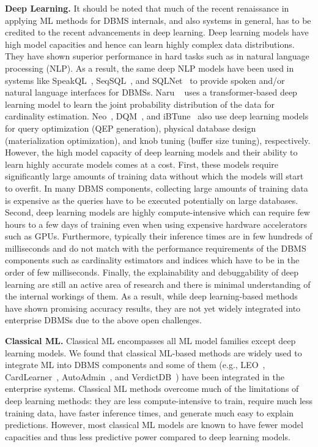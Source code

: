 \vspace{2mm}
\noindent \textbf{Deep Learning.} It should be noted that much of the recent renaissance in applying ML methods for DBMS internals, and also systems in general, has to be credited to the recent advancements in deep learning.
Deep learning models have high model capacities and hence can learn highly complex data distributions.
They have shown superior performance in hard tasks such as in natural language processing (NLP).
As a result, the same deep NLP models have been used in systems like SpeakQL~\cite{speakql}, SeqSQL~\cite{seq2sql}, and SQLNet~\cite{sqlnet} to provide spoken and/or natural language interfaces for DBMSs.
Naru ~\cite{naru} uses a transformer-based deep learning model to learn the joint probability distribution of the data for cardinality estimation.
Neo~\cite{neo}, DQM~\cite{dqm}, and iBTune~\cite{ibtune} also use deep learning models for query optimization (QEP generation), physical database design (materialization optimization), and knob tuning (buffer size tuning), respectively.
However, the high model capacity of deep learning models and their ability to learn highly accurate models comes at a cost.
First, these models require significantly large amounts of training data without which the models will start to overfit. In many DBMS components, collecting large amounts of training data is expensive as the queries have to be executed potentially on large databases.
Second, deep learning models are highly compute-intensive which can require few hours to a few days of training even when using expensive hardware accelerators such as GPUs.
Furthermore, typically their inference times are in few hundreds of milliseconds and do not match with the performance requirements of the DBMS components such as cardinality estimators and indices which have to be in the order of few milliseconds.
Finally, the explainability and debuggability of deep learning are still an active area of research and there is minimal understanding of the internal workings of them.
As a result, while deep learning-based methods have shown promising accuracy results, they are not yet widely integrated into enterprise DBMSs due to the above open challenges.


\vspace{2mm}
\noindent \textbf{Classical ML.} Classical ML encompasses all ML model families except deep learning models.
We found that classical ML-based methods are widely used to integrate ML into DBMS components and some of them (e.g., LEO~\cite{leo}, CardLearner~\cite{cardlearner}, AutoAdmin~\cite{autoadmin}, and VerdictDB~\cite{verdict}) have been integrated in the enterprise systems.
Classical ML methods overcome much of the limitations of deep learning methods: they are less compute-intensive to train, require much less training data, have faster inference times, and generate much easy to explain predictions.
However, most classical ML models are known to have fewer model capacities and thus less predictive power compared to deep learning models.



